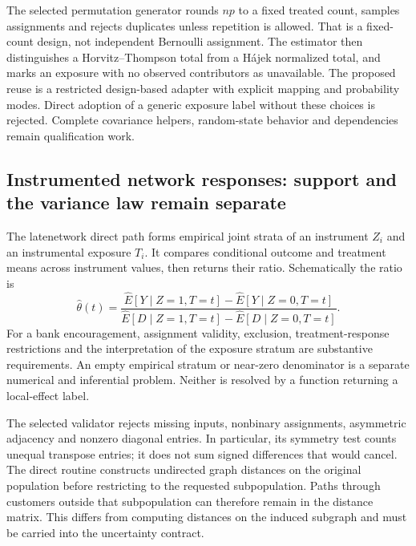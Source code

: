 The selected permutation generator rounds $np$ to a fixed treated count, samples assignments and rejects duplicates unless repetition is allowed. That is a fixed-count design, not independent Bernoulli assignment. The estimator then distinguishes a Horvitz--Thompson total from a H\'ajek normalized total, and marks an exposure with no observed contributors as unavailable. The proposed reuse is a restricted design-based adapter with explicit mapping and probability modes. Direct adoption of a generic exposure label without these choices is rejected. Complete covariance helpers, random-state behavior and dependencies remain qualification work.~\citep{exec25_rnet_exposure,exec25_rnet_choice}

\subsection{Instrumented network responses: support and the variance law remain separate}

The latenetwork direct path forms empirical joint strata of an instrument $Z_i$ and an instrumental exposure $T_i$. It compares conditional outcome and treatment means across instrument values, then returns their ratio. Schematically the ratio is
\[
 \widehat\theta(t)=
 \frac{\widehat E[Y\mid Z=1,T=t]-\widehat E[Y\mid Z=0,T=t]}
      {\widehat E[D\mid Z=1,T=t]-\widehat E[D\mid Z=0,T=t]}.
\]
For a bank encouragement, assignment validity, exclusion, treatment-response restrictions and the interpretation of the exposure stratum are substantive requirements. An empty empirical stratum or near-zero denominator is a separate numerical and inferential problem. Neither is resolved by a function returning a local-effect label.~\citep{exec25_rnet_late}

The selected validator rejects missing inputs, nonbinary assignments, asymmetric adjacency and nonzero diagonal entries. In particular, its symmetry test counts unequal transpose entries; it does not sum signed differences that would cancel. The direct routine constructs undirected graph distances on the original population before restricting to the requested subpopulation. Paths through customers outside that subpopulation can therefore remain in the distance matrix. This differs from computing distances on the induced subgraph and must be carried into the uncertainty contract.~\citep{exec25_rnet_late}

